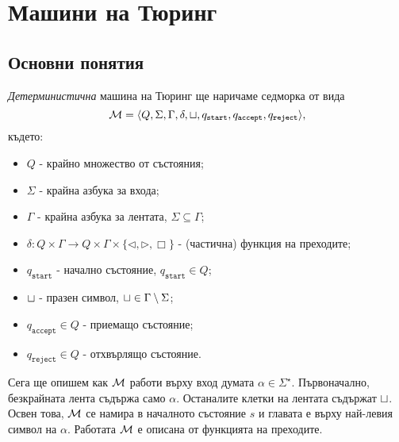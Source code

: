 \chapter{Машини на Тюринг}

\newcommand{\tape}[1]{\dots\blank\blank\blank{#1}\blank\blank\blank\dots}
\newcommand{\qstart}{q_{\texttt{start}}}
\newcommand{\qaccept}{q_{\texttt{accept}}}
\newcommand{\qreject}{q_{\texttt{reject}}}

\newcommand{\goleft}{\lhd}
\newcommand{\goright}{\rhd}
\newcommand{\stay}{\Box}



\section{Основни понятия}

{\em Детерминистична} машина на Тюринг ще наричаме седморка от вида 
\[\M = \TM,\] където:
\begin{itemize}
\item 
  $Q$ - крайно множество от състояния;
\item
  $\Sigma$ - крайна азбука за входа;
\item
  $\Gamma$ - крайна азбука за лентата, $\Sigma \subseteq \Gamma$;
\item
  $\delta:Q\times\Gamma \to Q\times \Gamma \times \{\goleft,\goright,\stay\}$ - (частична) функция на преходите;
\item
  $\qstart$ - начално състояние, $\qstart \in Q$;
\item
  $\sqcup$ - празен символ,  $\sqcup \in \Gamma \setminus \Sigma$;
\item
  $\qaccept \in Q$ - приемащо състояние;
\item
  \marginpar{$\qaccept \neq \qreject$}
  $\qreject \in Q$ - отхвърлящо състояние.
\end{itemize}

Сега ще опишем как $\mathcal{M}$ работи върху вход думата $\alpha \in \Sigma^\star$.
Първоначално, безкрайната лента съдържа само $\alpha$. Останалите клетки на лентата съдържат $\sqcup$.
Освен това, $\mathcal{M}$ се намира в началното състояние $s$ и главата е върху най-левия символ на $\alpha$.
Работата $\mathcal{M}$ е описана от функцията на преходите.
  
